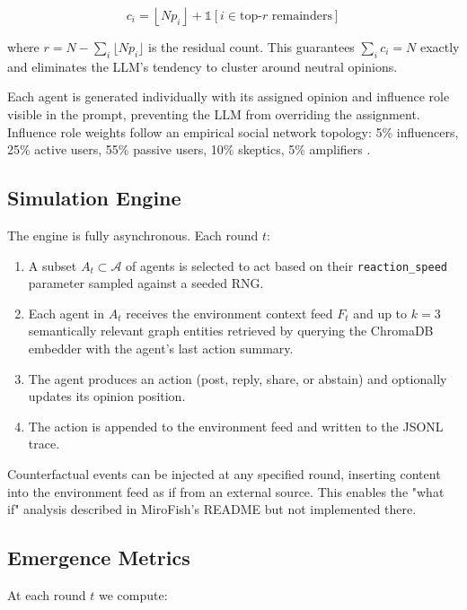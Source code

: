 \documentclass[10pt,twocolumn]{article}
\begin{document}
\begin{equation}
  c_i = \left\lfloor N p_i \right\rfloor + \mathbb{1}\left[i \in \text{top-}r \text{ remainders}\right]
\end{equation}

where $r = N - \sum_i \lfloor N p_i \rfloor$ is the residual count. This guarantees $\sum_i c_i = N$ exactly and eliminates the LLM's tendency to cluster around neutral opinions.

Each agent is generated individually with its assigned opinion and influence role visible in the prompt, preventing the LLM from overriding the assignment. Influence role weights follow an empirical social network topology: 5\% influencers, 25\% active users, 55\% passive users, 10\% skeptics, 5\% amplifiers \cite{bakshy2012role}.

\subsection{Simulation Engine}

The engine is fully asynchronous. Each round $t$:

\begin{enumerate}
  \item A subset $A_t \subset \mathcal{A}$ of agents is selected to act based on their \texttt{reaction\_speed} parameter sampled against a seeded RNG.
  \item Each agent in $A_t$ receives the environment context feed $F_t$ and up to $k=3$ semantically relevant graph entities retrieved by querying the ChromaDB embedder with the agent's last action summary.
  \item The agent produces an action (post, reply, share, or abstain) and optionally updates its opinion position.
  \item The action is appended to the environment feed and written to the JSONL trace.
\end{enumerate}

Counterfactual events can be injected at any specified round, inserting content into the environment feed as if from an external source. This enables the "what if" analysis described in MiroFish's README but not implemented there.

\subsection{Emergence Metrics}

At each round $t$ we compute:
\end{document}
